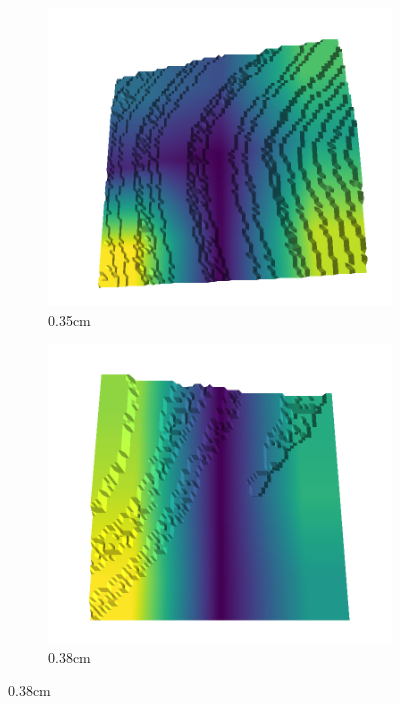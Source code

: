 \documentclass[../document.tex]{subfiles}
\begin{document}
\begin{figure}[H]
    \begin{subfigure}[b]{0.192\linewidth}
    \includegraphics[width=\linewidth]{../img/5/quarry/best/34-patch-3d-majavi-colormap-30.png}
    \caption{0.35cm}
    \label{fig : quarry-best-3}
    \end{subfigure}
    \begin{subfigure}[b]{0.192\linewidth}
    \includegraphics[width=\linewidth]{../img/5/quarry/best/38-patch-3d-majavi-colormap-40.png}
    \caption{0.38cm}

\end{subfigure}
\end{figure}
\end{document}
